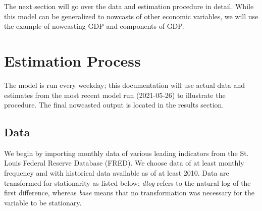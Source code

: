 \documentclass[11pt, letterpaper]{article}\usepackage[]{graphicx}\usepackage[]{color}
\begin{document}
The next section will go over the data and estimation procedure in detail. While this model can be generalized to nowcasts of other economic variables, we will use the example of nowcasting GDP and components of GDP.

\newpage
\section{Estimation Process}
The model is run every weekday; this documentation will use actual data and estimates from the most recent model run (2021-05-26) to illustrate the procedure. The final nowcasted output is located in the results section.

\subsection{Data}
We begin by importing monthly data of various leading indicators from the St. Louis Federal Reserve Database (FRED). We choose data of at least monthly frequency and with historical data available as of at least 2010. Data are transformed for stationarity as listed below; \textit{dlog} refers to the natural log of the first difference, whereas \textit{base} means that no transformation was necessary for the variable to be stationary.
\end{document}
